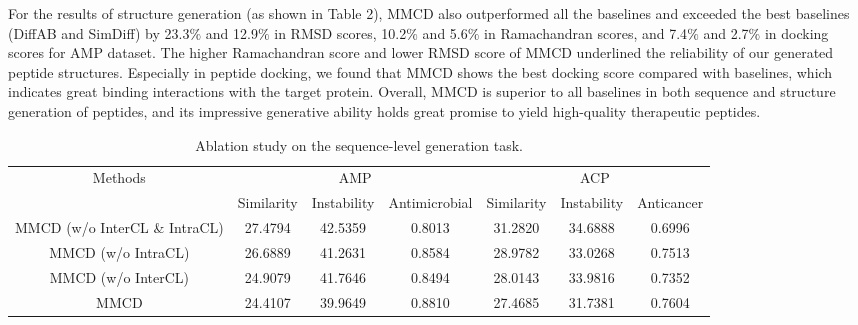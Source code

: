 \documentclass[letterpaper]{article}
\begin{document}
For the results of structure generation (as shown in Table 2), MMCD also outperformed all the baselines and exceeded the best baselines (DiffAB and SimDiff) by 23.3$\%$ and 12.9$\%$ in RMSD scores, 10.2$\%$ and 5.6$\%$ in Ramachandran scores, and 7.4$\%$ and 2.7$\%$ in docking scores for AMP dataset. The higher Ramachandran score and lower RMSD score of MMCD underlined the reliability of our generated peptide structures. Especially in peptide docking, we found that MMCD shows the best docking score compared with baselines, which indicates great binding interactions with the target protein. Overall, MMCD is superior to all baselines in both sequence and structure generation of peptides, and its impressive generative ability holds great promise to yield high-quality therapeutic peptides.

\begin{table}[ht]
\centering
\setlength{\tabcolsep}{6pt}
\begin{adjustbox}{width=0.79\columnwidth}
\begin{tabular}{ccccccc}
\hline
\multirow{2}{*}{Methods} & \multicolumn{3}{c}{AMP}                     & \multicolumn{3}{c}{ACP}                  \\ \cmidrule(r){2-4} \cmidrule(r){5-7}
                         & Similarity & Instability & Antimicrobial & Similarity & Instability & Anticancer \\ \hline
MMCD (w/o InterCL \& IntraCL)  & 27.4794     & 42.5359      & 0.8013         & 31.2820     & 34.6888      & 0.6996      \\
MMCD (w/o IntraCL)             & 26.6889     & 41.2631      & 0.8584         & 28.9782     & 33.0268      & 0.7513      \\
MMCD (w/o InterCL)             & 24.9079     & 41.7646      & 0.8494         & 28.0143     & 33.9816      & 0.7352      \\
MMCD                           & 24.4107     & 39.9649      & 0.8810         & 27.4685     & 31.7381      & 0.7604      \\ \hline
\end{tabular}
\end{adjustbox}
\caption{Ablation study on the sequence-level generation task.}
\end{table}
\end{document}
